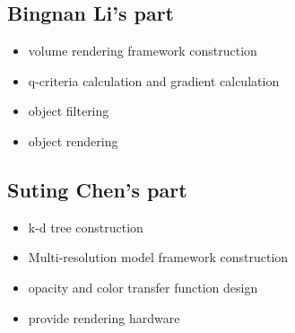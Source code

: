 \documentclass[acmtog]{acmart}
\begin{document}
    \subsection{Bingnan Li's part}\label{subsec:bingnan-li's-part}
    \begin{itemize}
        \item volume rendering framework construction
        \item q-criteria calculation and gradient calculation
        \item object filtering
        \item object rendering
    \end{itemize}

    \subsection{Suting Chen's part}\label{subsec:suting-chen's-part}
    \begin{itemize}
        \item k-d tree construction
        \item Multi-resolution model framework construction
        \item opacity and color transfer function design
        \item provide rendering hardware
    \end{itemize}
\end{document}
